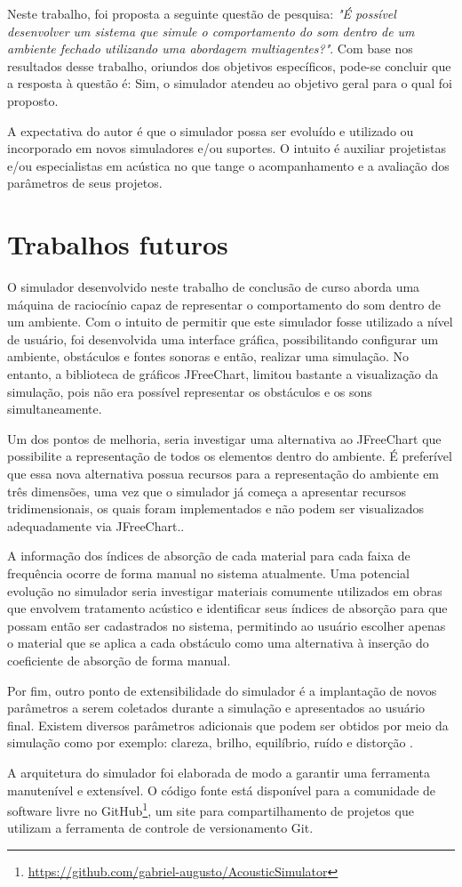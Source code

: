 Neste trabalho, foi proposta a seguinte questão de pesquisa: \textit{"É possível desenvolver um sistema que simule o comportamento do som dentro de um ambiente fechado utilizando uma abordagem multiagentes?"}. Com base nos resultados desse trabalho, oriundos dos objetivos específicos, pode-se concluir que a resposta à questão é: Sim, o simulador atendeu ao objetivo geral para o qual foi proposto.

A expectativa do autor é que o simulador  possa ser evoluído e utilizado ou incorporado em novos simuladores e/ou suportes. O intuito é auxiliar projetistas e/ou especialistas em acústica no que tange o acompanhamento e a avaliação dos parâmetros de seus projetos.

\section{Trabalhos futuros}

O simulador desenvolvido neste trabalho de conclusão de curso aborda uma máquina de raciocínio capaz de representar o comportamento do som dentro de um ambiente. Com o intuito de permitir que este simulador fosse utilizado a nível de usuário, foi desenvolvida uma interface gráfica, possibilitando configurar um ambiente, obstáculos e fontes sonoras e então, realizar uma simulação. No entanto, a biblioteca de gráficos JFreeChart, limitou bastante a visualização da simulação, pois não era possível representar os obstáculos e os sons simultaneamente.

Um dos pontos de melhoria, seria investigar uma alternativa ao JFreeChart que possibilite a representação de todos os elementos dentro do ambiente. É preferível que essa nova alternativa possua recursos para a representação do ambiente em três dimensões, uma vez que o simulador já começa a apresentar recursos tridimensionais, os quais foram implementados e não podem ser visualizados adequadamente via JFreeChart..

A informação dos índices de absorção de cada material para cada faixa de frequência ocorre de forma manual no sistema atualmente. Uma potencial evolução no simulador seria investigar materiais comumente utilizados em obras que envolvem tratamento acústico e identificar seus índices de absorção para que possam então ser cadastrados no sistema, permitindo ao usuário escolher apenas o material que se aplica a cada obstáculo como uma alternativa à inserção do coeficiente de absorção de forma manual.

Por fim, outro ponto de extensibilidade do simulador é a implantação de novos parâmetros a serem coletados durante a simulação e apresentados ao usuário final. Existem diversos parâmetros adicionais que podem ser obtidos por meio da simulação como por exemplo: clareza, brilho, equilíbrio, ruído e distorção \cite{figueiredo}.

A arquitetura do simulador foi elaborada de modo a garantir uma ferramenta manutenível e extensível. O código fonte está disponível para a comunidade de software livre no GitHub\footnote{\url{https://github.com/gabriel-augusto/AcousticSimulator}}, um site para compartilhamento de projetos que utilizam a ferramenta de controle de versionamento Git.